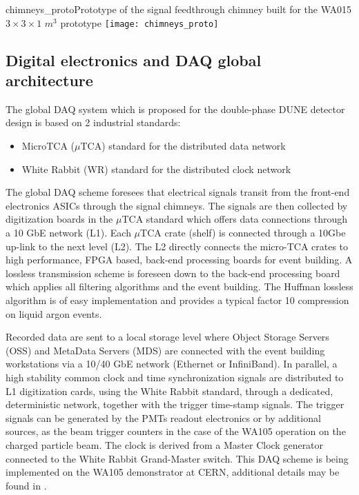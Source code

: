 \begin{cdrfigure}{chimneys_proto}{Prototype of the signal feedthrough chimney built for the WA015 $3\times3\times 1$ $m^3$ prototype}
\texttt{[image: chimneys\_proto]}
\end{cdrfigure}


\subsection{Digital electronics and DAQ global architecture}

The global DAQ system which is proposed for the double-phase DUNE detector design is based on 2 industrial standards:
\begin{itemize}
\item MicroTCA ($\mu$TCA) standard for the distributed data network \cite{mTCA-standard}
\item White Rabbit (WR) standard for the distributed clock network \cite{WR-standard}
\end{itemize}

The global DAQ scheme foresees that electrical signals transit from the front-end electronics ASICs through the signal chimneys. The signals are then collected by digitization boards in the $\mu$TCA standard which offers data connections through a 10 GbE network (L1). Each $\mu$TCA crate (shelf) is connected through a 10Gbe up-link to the next level (L2). The L2 directly connects the micro-TCA crates to high performance, FPGA based,  back-end processing boards for event building. A lossless transmission scheme is  foreseen down to the back-end processing board which applies all filtering algorithms and the event building. The Huffman lossless algorithm is of easy implementation and  provides a typical factor 10 compression on liquid argon events. 

Recorded data are sent to a local storage level where Object Storage Servers (OSS) and MetaData Servers (MDS) are connected with the event building workstations via a 10/40 GbE network (Ethernet or InfiniBand). In parallel, a high stability common clock and time synchronization signals are distributed to L1 digitization cards, using the White Rabbit standard, through a dedicated, deterministic network, together with the trigger time-stamp signals. The trigger signals can be  generated by the  PMTs readout electronics or by additional sources, as the beam trigger counters in the case of the WA105 operation on the charged particle beam. The clock is derived from a Master Clock generator connected to the White Rabbit Grand-Master switch. This DAQ scheme is being implemented on the WA105 demonstrator at CERN, additional details may be found in \cite{WA105_TDR}.  

